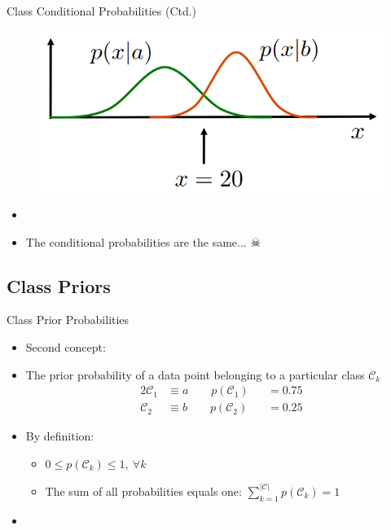 \begin{frame}{Class Conditional Probabilities (Ctd.)}{}
	\begin{figure}
		\centering
		\includegraphics[scale=0.5]{03_decision_theory/02_img/conditional_probabilities_overlap3}
	\end{figure}
	\vspace*{-3mm}
	\begin{itemize}
		\item {}
		\item The conditional probabilities are the same... $\skull$
	\end{itemize}
\end{frame}


\subsection{Class Priors}

\begin{frame}{Class Prior Probabilities}{}
	\begin{itemize}
		\item Second concept: 
		\item The prior probability of a data point belonging to a particular class $\mathcal{C}_k$
		\begin{alignat*}{2}
			\mathcal{C}_1 &\equiv a \qquad p(\mathcal{C}_1) &&= 0.75 \\
			\mathcal{C}_2 &\equiv b \qquad p(\mathcal{C}_2) &&= 0.25
		\end{alignat*}
		\item By definition:
		\begin{itemize}
			\item $0 \le p(\mathcal{C}_k) \le 1,\ \forall k$
			\item The sum of all probabilities equals one: $\sum_{k=1}^{\vert \mathcal{C} \vert} p(\mathcal{C}_k) = 1$
		\end{itemize}
		\item {}
	\end{itemize}
\end{frame}


